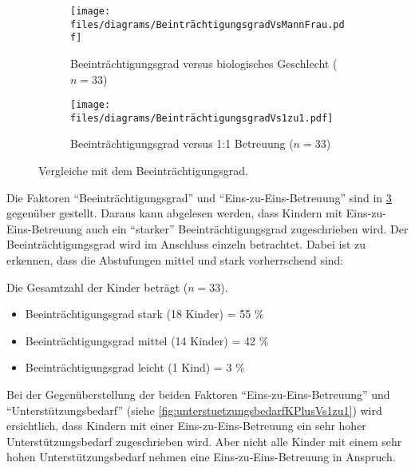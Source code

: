 \documentclass[
  ngerman,
  11pt,
  paper=a4,
  twoside,
  titlepage=true,
  openright,
  abstract=on,
  toc=listofnumbered,
  numbers=noenddot,
  chapterprefix=true,
  headings=optiontohead,
  svgnames,
  dvipsnames]{scrreprt}
\providecommand{\tightlist}{%
  \setlength{\itemsep}{0pt}\setlength{\parskip}{0pt}}
\begin{document}
\begin{figure}
     \centering
     \begin{subfigure}[b]{0.49\textwidth}
         \centering
         \texttt{[image: files/diagrams/BeinträchtigungsgradVsMannFrau.pdf]}
         \caption{Beeinträchtigungsgrad versus biologisches Geschlecht ($n=33$)}
         \label{fig:beeintraechtigungsgradVsMannFrau}
     \end{subfigure}
     \hfill
     \begin{subfigure}[b]{0.49\textwidth}
         \centering
         \texttt{[image: files/diagrams/BeinträchtigungsgradVs1zu1.pdf]}
         \caption{Beeinträchtigungsgrad versus 1:1 Betreuung ($n=33$)}
         \label{fig:beeintraechtigung1zu1}
     \end{subfigure}
     \caption{Vergleiche mit dem Beeinträchtigungsgrad.}
\end{figure}

Die Faktoren “Beeinträchtigungsgrad” und “Eins-zu-Eins-Betreuung” sind
in \cref{fig:beeintraechtigung1zu1} gegenüber gestellt. Daraus kann
abgelesen werden, dass Kindern mit Eins-zu-Eins-Betreuung auch ein
“starker” Beeinträchtigungsgrad zugeschrieben wird. Der
Beeinträchtigungsgrad wird im Anschluss einzeln betrachtet. Dabei ist zu
erkennen, dass die Abstufungen mittel und stark vorherrschend sind:

Die Gesamtzahl der Kinder beträgt (\(n=33\)).

\begin{itemize}
\tightlist
\item
  Beeinträchtigungsgrad stark (18 Kinder) = 55 \%
\item
  Beeinträchtigungsgrad mittel (14 Kinder) = 42 \%
\item
  Beeinträchtigungsgrad leicht (1 Kind) = 3 \%
\end{itemize}

Bei der Gegenüberstellung der beiden Faktoren “Eins-zu-Eins-Betreuung”
und “Unterstützungsbedarf” (siehe
\cref{fig:unterstuetzungsbedarfKPlusVs1zu1}) wird ersichtlich, dass
Kindern mit einer Eins-zu-Eins-Betreuung ein sehr hoher
Unterstützungsbedarf zugeschrieben wird. Aber nicht alle Kinder mit
einem sehr hohen Unterstützungsbedarf nehmen eine Eins-zu-Eins-Betreuung
in Anspruch.
\end{document}

